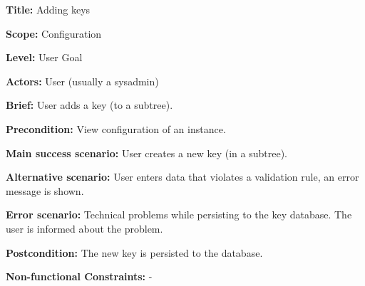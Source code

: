 
\begin{DoxyItemize}
\item {\bfseries{Title\+:}} Adding keys
\item {\bfseries{Scope\+:}} Configuration
\item {\bfseries{Level\+:}} User Goal
\item {\bfseries{Actors\+:}} User (usually a sysadmin)
\item {\bfseries{Brief\+:}} User adds a key (to a subtree).
\end{DoxyItemize}


\begin{DoxyItemize}
\item {\bfseries{Precondition\+:}} View configuration of an instance.
\item {\bfseries{Main success scenario\+:}} User creates a new key (in a subtree).
\item {\bfseries{Alternative scenario\+:}} User enters data that violates a validation rule, an error message is shown.
\item {\bfseries{Error scenario\+:}} Technical problems while persisting to the key database. The user is informed about the problem.
\item {\bfseries{Postcondition\+:}} The new key is persisted to the database.
\item {\bfseries{Non-\/functional Constraints\+:}} -\/ 
\end{DoxyItemize}